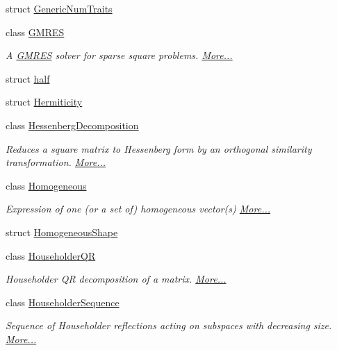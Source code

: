 \begin{DoxyCompactItemize}
struct \hyperlink{struct_eigen_1_1_generic_num_traits}{Generic\+Num\+Traits}
\item 
class \hyperlink{group___iterative_linear_solvers___module_class_eigen_1_1_g_m_r_e_s}{G\+M\+R\+ES}
\begin{DoxyCompactList}\small\item\em A \hyperlink{group___iterative_linear_solvers___module_class_eigen_1_1_g_m_r_e_s}{G\+M\+R\+ES} solver for sparse square problems.  \hyperlink{group___iterative_linear_solvers___module_class_eigen_1_1_g_m_r_e_s}{More...}\end{DoxyCompactList}\item 
struct \hyperlink{struct_eigen_1_1half}{half}
\item 
struct \hyperlink{struct_eigen_1_1_hermiticity}{Hermiticity}
\item 
class \hyperlink{group___eigenvalues___module_class_eigen_1_1_hessenberg_decomposition}{Hessenberg\+Decomposition}
\begin{DoxyCompactList}\small\item\em Reduces a square matrix to Hessenberg form by an orthogonal similarity transformation.  \hyperlink{group___eigenvalues___module_class_eigen_1_1_hessenberg_decomposition}{More...}\end{DoxyCompactList}\item 
class \hyperlink{group___geometry___module_class_eigen_1_1_homogeneous}{Homogeneous}
\begin{DoxyCompactList}\small\item\em Expression of one (or a set of) homogeneous vector(s)  \hyperlink{group___geometry___module_class_eigen_1_1_homogeneous}{More...}\end{DoxyCompactList}\item 
struct \hyperlink{struct_eigen_1_1_homogeneous_shape}{Homogeneous\+Shape}
\item 
class \hyperlink{group___q_r___module_class_eigen_1_1_householder_q_r}{Householder\+QR}
\begin{DoxyCompactList}\small\item\em Householder QR decomposition of a matrix.  \hyperlink{group___q_r___module_class_eigen_1_1_householder_q_r}{More...}\end{DoxyCompactList}\item 
class \hyperlink{group___householder___module_class_eigen_1_1_householder_sequence}{Householder\+Sequence}
\begin{DoxyCompactList}\small\item\em Sequence of Householder reflections acting on subspaces with decreasing size.  \hyperlink{group___householder___module_class_eigen_1_1_householder_sequence}{More...}\end{DoxyCompactList}\item 

\end{DoxyCompactItemize}
